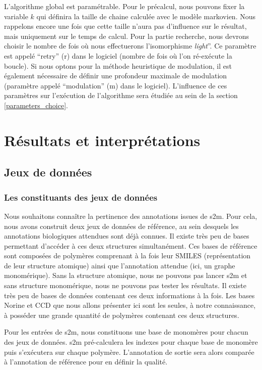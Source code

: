 L'algorithme global est paramétrable.
Pour le précalcul, nous pouvons fixer la variable $k$ qui définira la taille de chaine calculée avec le modèle markovien.
Nous rappelons encore une fois que cette taille n'aura pas d'influence sur le résultat, mais uniquement sur le temps de calcul.
Pour la partie recherche, nous devrons choisir le nombre de fois où nous effectuerons l'isomorphisme \textit{light}''.
Ce paramètre est appelé ``retry'' (r) dans le logiciel (nombre de fois où l'on ré-exécute la boucle).
Si nous optons pour la méthode heuristique de modulation, il est également nécessaire de définir une profondeur maximale de modulation (paramètre appelé ``modulation'' (m) dans le logiciel).
L'influence de ces paramètres sur l'exécution de l'algorithme sera étudiée au sein de la section \ref{parameters_choice}.




\section{Résultats et interprétations}

\label{res_int}

\subsection{Jeux de données}

\subsubsection{Les constituants des jeux de données}

Nous souhaitons connaître la pertinence des annotations issues de s2m.
Pour cela, nous avons construit deux jeux de données de référence, au sein desquels les annotations biologiques attendues sont déjà connues.
Il existe très peu de bases permettant d'accéder à ces deux structures simultanément.
Ces bases de référence sont composées de polymères comprenant à la fois leur SMILES (représentation de leur structure atomique) ainsi que l'annotation attendue (ici, un graphe monomérique).
Sans la structure atomique, nous ne pouvons pas lancer s2m et sans structure monomérique, nous ne pouvons pas tester les résultats.
Il existe très peu de bases de données contenant ces deux informations à la fois.
Les bases Norine et CCD que nous allons présenter ici sont les seules, à notre connaissance, à posséder une grande quantité de polymères contenant ces deux structures.

Pour les entrées de s2m, nous constituons une base de monomères pour chacun des jeux de données.
s2m pré-calculera les indexes pour chaque base de monomère puis s'exécutera sur chaque polymère.
L'annotation de sortie sera alors comparée à l'annotation de référence pour en définir la qualité.


